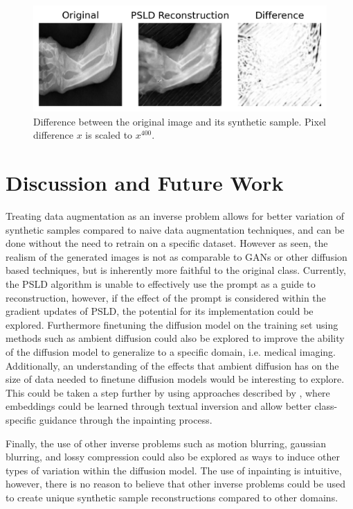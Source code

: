 \documentclass{article}
\begin{document}
\begin{figure}[ht]
    \vskip -0.1in
    \begin{center}
        \centerline{\includegraphics[width=\columnwidth]{difference.png}}
        \caption{Difference between the original image and its synthetic sample. Pixel difference $x$ is scaled to $x^{400}$.}
        \label{difference}
    \end{center}
    \vskip -0.3in
\end{figure}

\section{Discussion and Future Work}

Treating data augmentation as an inverse problem allows for better variation of synthetic samples compared to naive data augmentation techniques, and can be done
without the need to retrain on a specific dataset. However as seen, the realism of the generated images is not as comparable to GANs or other diffusion based techniques,
but is inherently more faithful to the original class. Currently, the PSLD algorithm is unable to effectively use the prompt as a guide to reconstruction, however, if the 
effect of the prompt is considered within the gradient updates of PSLD, the potential for its implementation could be explored. Furthermore finetuning the diffusion model on
the training set using methods such as ambient diffusion \cite{2305.19256} could also be explored to improve the ability of the diffusion model to generalize to 
a specific domain, i.e. medical imaging. Additionally, an understanding of the effects that ambient diffusion has on the size of data needed to finetune diffusion models
would be interesting to explore. This could be taken a step further by using approaches described by \cite{2302.07944}, where embeddings could be learned through
textual inversion and allow better class-specific guidance through the inpainting process. 

Finally, the use of other inverse problems such as motion blurring, gaussian blurring, and lossy compression could also be explored as ways to induce other types of variation
within the diffusion model. The use of inpainting is intuitive, however, there is no reason to believe that other inverse problems could be used to create unique synthetic
sample reconstructions compared to other domains. 
\end{document}
